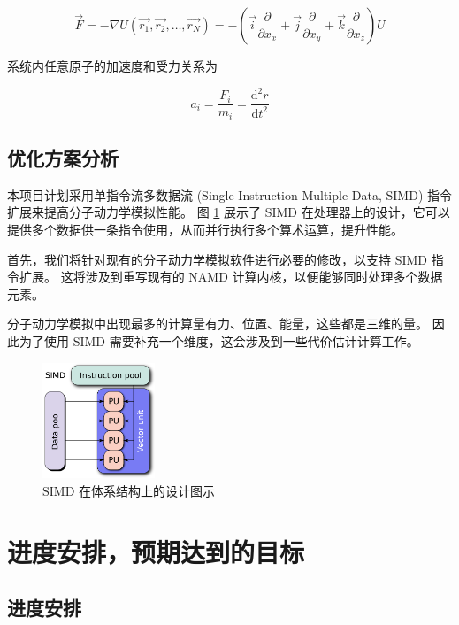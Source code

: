 \begin{equation}
    \vec{F} = -\nabla U (\vec{r_1}, \vec{r_2}, \dots, \vec{r_N}) = - \left( \vec{i} \frac{\partial}{\partial x_x} + \vec{j}\frac{\partial}{\partial x_y} + \vec{k} \frac{\partial}{\partial x_z}\right) U
\end{equation}

系统内任意原子的加速度和受力关系为\cite{易浩杰2019纳米静电喷射的分子动力学模拟研究}

\begin{equation}
    a_i = \frac{F_i}{m_i} = \frac{\mathrm{d}^2 r}{\mathrm{d} t^2}
\end{equation}


\subsection{优化方案分析}

本项目计划采用单指令流多数据流 (Single Instruction Multiple Data, SIMD) 指令扩展来提高分子动力学模拟性能。
图 \ref{fig:simd} 展示了 SIMD 在处理器上的设计，它可以提供多个数据供一条指令使用，从而并行执行多个算术运算，提升性能。


首先，我们将针对现有的分子动力学模拟软件进行必要的修改，以支持 SIMD 指令扩展。
这将涉及到重写现有的 NAMD 计算内核，以便能够同时处理多个数据元素。

分子动力学模拟中出现最多的计算量有力、位置、能量，这些都是三维的量。
因此为了使用 SIMD 需要补充一个维度，这会涉及到一些代价估计计算工作。


\begin{figure}[h]
    \centering
    \includegraphics[width=0.3\textwidth]{images/SIMD2.svg.png}
    \caption{SIMD 在体系结构上的设计图示}
    \label{fig:simd}
\end{figure}

\section{进度安排，预期达到的目标}

\subsection{进度安排}

